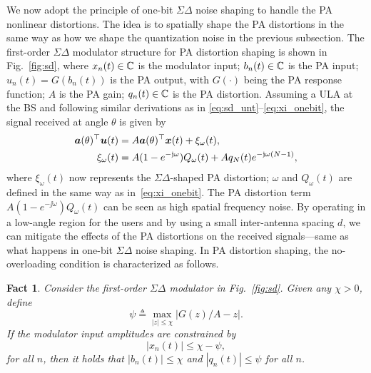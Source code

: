 \documentclass[10pt,twocolumn,twoside]{IEEEtran}
\newtheorem{Fact}{Fact}
\begin{document}
We now adopt the principle of one-bit $\Sigma \Delta$ noise shaping
to handle the PA nonlinear distortions.
The idea is to spatially shape the PA distortions in the same way as how we shape the quantization noise in the previous subsection.
The first-order $\Sigma \Delta$ modulator structure for PA distortion shaping is shown in Fig.~\ref{fig:sd},
where
$x_n(t) \in \mathbb{C}$ is the modulator input;
$b_n(t) \in \mathbb{C}$ is the PA input;
$u_n(t) = G(b_n(t))$ is the PA output, with $G(\cdot)$ being the PA response function;
$A$ is the PA gain;
$q_n(t) \in \mathbb{C}$ is the PA distortion.
Assuming a ULA at the BS
and following similar derivations as in \eqref{eq:sd_unt}--\eqref{eq:xi_onebit},
the signal received at angle $\theta$ is given by
\begin{align}
	\ba(\theta)^\Tsf \bu(t) &= A\ba(\theta)^\Tsf \bx(t) + \xi_\omega(t), \label{eq:au} \\ %
	\xi_\omega(t) &= A(1 - e^{-\jj \omega})  Q_\omega(t)  +  Aq_N(t) e^{- \jj \omega(N-1)}, \label{eq:xi}
\end{align}
where $\xi_\omega(t)$ now represents the $\Sigma \Delta$-shaped PA distortion;
$\omega$ and $Q_\omega(t)$ are defined in the same way as in~\eqref{eq:xi_onebit}.
The PA distortion term $A(1 - e^{-\jj \omega})  Q_\omega(t)$ can be seen as high spatial frequency noise.
By operating in a low-angle region for the users and by using a small inter-antenna spacing $d$, we can mitigate the effects of the PA distortions on the received signals---same as what happens in one-bit $\Sigma \Delta$ noise shaping.
In PA distortion shaping, the no-overloading condition is characterized as follows.
\begin{Fact} \label{Fac:no_overloading}
	Consider the first-order $\Sigma \Delta$ modulator in Fig.~\ref{fig:sd}.
	Given any $\chi > 0$, define
	\begin{equation}\label{eq:C}
	\psi \triangleq \max_{|z| \le \chi}|G(z)/A - z|.
	\end{equation}
	If the modulator input amplitudes are constrained by
	\begin{equation}\label{eq:cont_no_overloading}
		|{x}_{n}(t)| \le   \chi - \psi,
	\end{equation}
    for all $n$, then it holds that $|b_n(t)| \le \chi$ and $|q_{n}(t)| \le \psi$ for all $n$.
\end{Fact}
\end{document}
